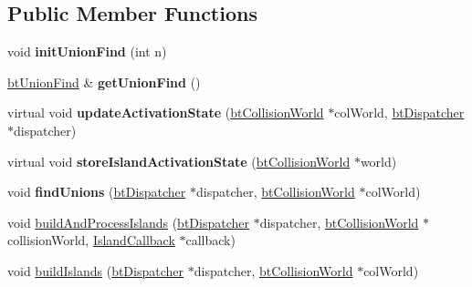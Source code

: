 \subsection*{Public Member Functions}
\begin{DoxyCompactItemize}
\item 
\mbox{\label{classbtSimulationIslandManager_ab9c747e8d11c29f7537c82483280b20d}} 
void {\bfseries init\+Union\+Find} (int n)
\item 
\mbox{\label{classbtSimulationIslandManager_a5a2829a514e99ec4731501b19f21ad29}} 
\hyperlink{classbtUnionFind}{bt\+Union\+Find} \& {\bfseries get\+Union\+Find} ()
\item 
\mbox{\label{classbtSimulationIslandManager_a61c895f8349447d567d42bd6a3ba769f}} 
virtual void {\bfseries update\+Activation\+State} (\hyperlink{classbtCollisionWorld}{bt\+Collision\+World} $\ast$col\+World, \hyperlink{classbtDispatcher}{bt\+Dispatcher} $\ast$dispatcher)
\item 
\mbox{\label{classbtSimulationIslandManager_a136d82abf91b4fd489f7338d456a95d3}} 
virtual void {\bfseries store\+Island\+Activation\+State} (\hyperlink{classbtCollisionWorld}{bt\+Collision\+World} $\ast$world)
\item 
\mbox{\label{classbtSimulationIslandManager_a3fd9a1a91e254d3f5736b71e48f9e7cc}} 
void {\bfseries find\+Unions} (\hyperlink{classbtDispatcher}{bt\+Dispatcher} $\ast$dispatcher, \hyperlink{classbtCollisionWorld}{bt\+Collision\+World} $\ast$col\+World)
\item 
void \hyperlink{classbtSimulationIslandManager_ab0f52dc46bc01c6754f4cb32ba26c99a}{build\+And\+Process\+Islands} (\hyperlink{classbtDispatcher}{bt\+Dispatcher} $\ast$dispatcher, \hyperlink{classbtCollisionWorld}{bt\+Collision\+World} $\ast$collision\+World, \hyperlink{structbtSimulationIslandManager_1_1IslandCallback}{Island\+Callback} $\ast$callback)
\item 
void \hyperlink{classbtSimulationIslandManager_aea0b5869eca2d034ac9c643e149a5e01}{build\+Islands} (\hyperlink{classbtDispatcher}{bt\+Dispatcher} $\ast$dispatcher, \hyperlink{classbtCollisionWorld}{bt\+Collision\+World} $\ast$col\+World)
\item 

\end{DoxyCompactItemize}

